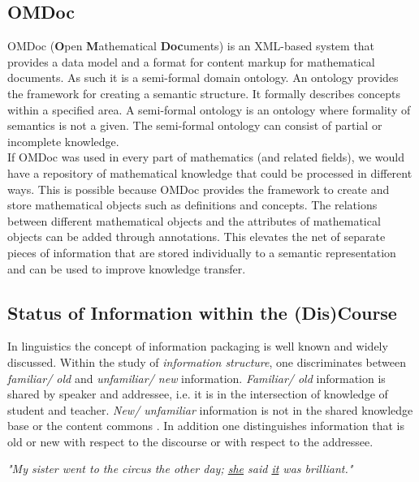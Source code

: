 \documentclass[twoside, 12pt]{article}
\begin{document}
\subsection{OMDoc}
\label{sec:OMDoc}

OMDoc (\textbf{O}pen \textbf{M}athematical \textbf{Doc}uments) \cite{Kohlhase:OMDoc1.2} is an XML-based system that provides a data model and a format for content markup for mathematical documents. As such it is a semi-formal domain ontology. An ontology provides the framework for creating a semantic structure. It formally describes concepts within a specified area. A semi-formal ontology \cite{Sheth:npentrel14} is an ontology where formality of semantics is not a given. The semi-formal ontology can consist of partial or incomplete knowledge. \\

If OMDoc was used in every part of mathematics (and related fields), we would have a repository of mathematical knowledge that could be processed in different ways. This is possible because OMDoc provides the framework to create and store mathematical objects such as definitions and concepts. The relations between different mathematical objects and the attributes of mathematical objects can be added through annotations. This elevates the net of separate pieces of information that are stored individually to a semantic representation and can be used to improve knowledge transfer.\\


\subsection{Status of Information within the (Dis)Course}
\label{sec:infostatus}

In linguistics the concept of information packaging \cite{CambridgeGrammar:npentrel14} is well known and widely discussed. Within the study of \textit{information structure}, one discriminates between \textit{familiar/ old} and \textit{unfamiliar/ new} information. \textit{Familiar/ old} information is shared by speaker and addressee, i.e. it is in the intersection of knowledge of student and teacher. \textit{New/ unfamiliar} information is not in the shared knowledge base or the content commons \cite{CNX:whitepaper}. In addition one distinguishes information that is old or new with respect to the discourse or with respect to the addressee.

\begin{center}
\textit{"My sister went to the circus the other day; \underline{she} said \underline{it} was brilliant."}\\
\end{center}
\end{document}
